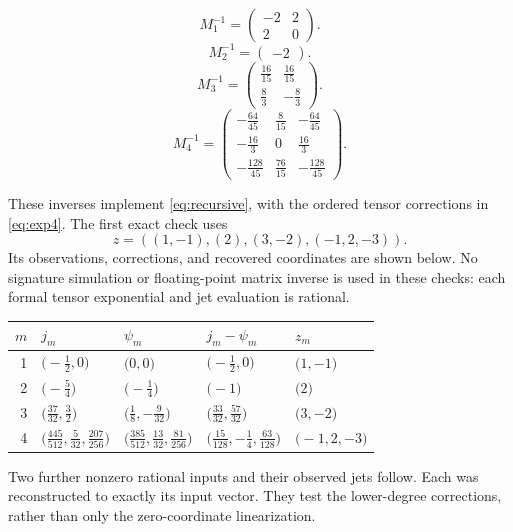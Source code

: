\documentclass[11pt,a4paper]{article}
\numberwithin{equation}{section}
\theoremstyle{definition}
\theoremstyle{remark}
\begin{document}
\[
M_1^{-1}=\begin{pmatrix}
-2 & 2 \\
2 & 0
\end{pmatrix}.
\]
\[
M_2^{-1}=\begin{pmatrix}
-2
\end{pmatrix}.
\]
\begingroup
\renewcommand{\arraystretch}{1.6}
\[
M_3^{-1}=\begin{pmatrix}
\frac{16}{15} & \frac{16}{15} \\
\frac{8}{3} & -\frac{8}{3}
\end{pmatrix}.
\]
\[
M_4^{-1}=\begin{pmatrix}
-\frac{64}{45} & \frac{8}{15} & -\frac{64}{45} \\
-\frac{16}{3} & 0 & \frac{16}{3} \\
-\frac{128}{45} & \frac{76}{15} & -\frac{128}{45}
\end{pmatrix}.
\]
\endgroup

These inverses implement \eqref{eq:recursive}, with the ordered tensor
corrections in \eqref{eq:exp4}. The first exact check uses
\[
 z=((1,-1),(2),(3,-2),(-1,2,-3)).
\]
Its observations, corrections, and recovered coordinates are shown below.
No signature simulation or floating-point matrix inverse is used in these
checks: each formal tensor exponential and jet evaluation is rational.

\begin{center}
\small
\renewcommand{\arraystretch}{1.7}
\begin{tabular}{@{}rllll@{}}
\toprule
$m$ & $j_m$ & $\psi_m$ & $j_m-\psi_m$ & $z_m$ \\
\midrule
1 & $\bigl(-\frac{1}{2},0\bigr)$ & $\bigl(0,0\bigr)$ & $\bigl(-\frac{1}{2},0\bigr)$ & $\bigl(1,-1\bigr)$ \\
2 & $\bigl(-\frac{5}{4}\bigr)$ & $\bigl(-\frac{1}{4}\bigr)$ & $\bigl(-1\bigr)$ & $\bigl(2\bigr)$ \\
3 & $\bigl(\frac{37}{32},\frac{3}{2}\bigr)$ & $\bigl(\frac{1}{8},-\frac{9}{32}\bigr)$ & $\bigl(\frac{33}{32},\frac{57}{32}\bigr)$ & $\bigl(3,-2\bigr)$ \\
4 & $\bigl(\frac{445}{512},\frac{5}{32},\frac{207}{256}\bigr)$ & $\bigl(\frac{385}{512},\frac{13}{32},\frac{81}{256}\bigr)$ & $\bigl(\frac{15}{128},-\frac{1}{4},\frac{63}{128}\bigr)$ & $\bigl(-1,2,-3\bigr)$ \\
\bottomrule
\end{tabular}
\end{center}

Two further nonzero rational inputs and their observed jets follow. Each
was reconstructed to exactly its input vector. They test the lower-degree
corrections, rather than only the zero-coordinate linearization.
\end{document}
